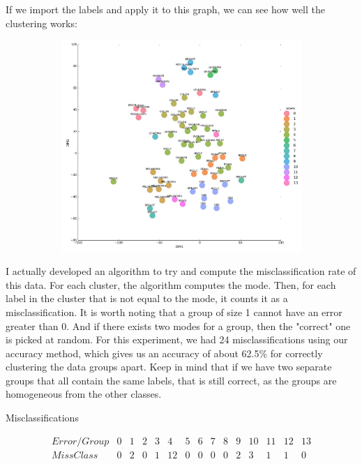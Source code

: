 \documentclass[20pt]{article} %
\begin{document}
\newpage
If we import the labels and apply it to this graph, we can see how well the clustering works:
\begin{figure}[!htbp]
  	\centering
   	\begin{subfigure}[p]{1.2\linewidth}
    	\includegraphics[width=\linewidth]{./figures/Best_clustering_labels.png}
   	\end{subfigure}
\end{figure}
I actually developed an algorithm to try and compute the misclassification rate of this data.  For each cluster, the algorithm computes the mode.  Then, for each label in the cluster that is not equal to the mode, it counts it as a misclassification.  It is worth noting that a group of size 1 cannot have an error greater than 0. And if there exists two modes for a group, then the "correct" one is picked at random.  For this experiment, we had 24 misclassifications using our accuracy method, which gives us an accuracy of about 62.5\% for correctly clustering the data groups apart.  Keep in mind that if we have two separate groups that all contain the same labels, that is still correct, as the groups are homogeneous from the other classes.

\newpage
 \begin{table}[!htbp]
 \caption{Misclassifications}
 \[\begin{array}{c|cccccccccccccc} 
 Error/Group & 0 & 1 & 2 & 3 & 4 & 5 &6&7&8&9&10&11&12&13\\
 \hline
 MissClass & 0 & 2 & 0 & 1 & 12 & 0 & 0 & 0 & 0 & 2 & 3 & 1 & 1 & 0\\
 \end{array}\]
 \end{table}
\end{document}
